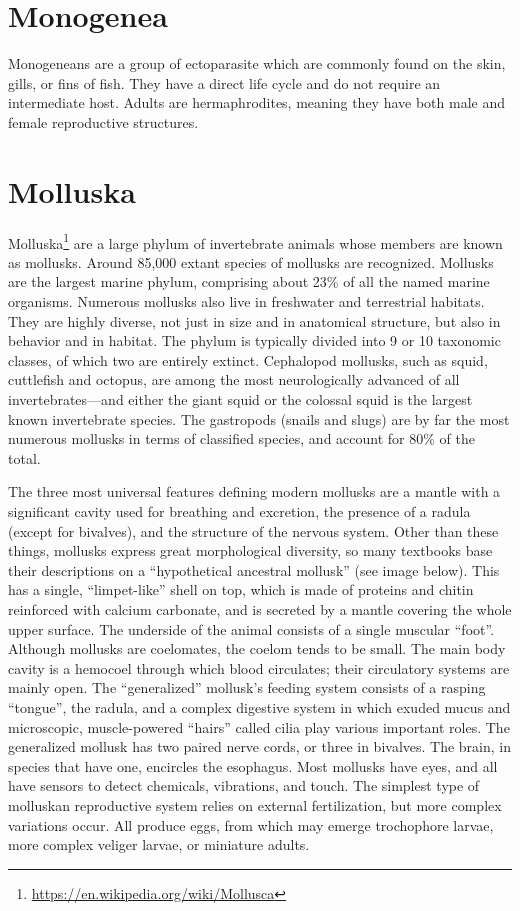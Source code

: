 \documentclass[]{book}
\let\rmarkdownfootnote\footnote%
\def\footnote{\protect\rmarkdownfootnote}
\renewcommand{\href}[2]{#2\footnote{\url{#1}}}
\theoremstyle{definition}
\theoremstyle{definition}
\theoremstyle{definition}
\theoremstyle{remark}
\begin{document}
\section{Monogenea}\label{monogenea}

Monogeneans are a group of ectoparasite which are commonly found on the
skin, gills, or fins of fish. They have a direct life cycle and do not
require an intermediate host. Adults are hermaphrodites, meaning they
have both male and female reproductive structures.

\section{Molluska}\label{molluska}

\href{https://en.wikipedia.org/wiki/Mollusca}{Molluska} are a large
phylum of invertebrate animals whose members are known as mollusks.
Around 85,000 extant species of mollusks are recognized. Mollusks are
the largest marine phylum, comprising about 23\% of all the named marine
organisms. Numerous mollusks also live in freshwater and terrestrial
habitats. They are highly diverse, not just in size and in anatomical
structure, but also in behavior and in habitat. The phylum is typically
divided into 9 or 10 taxonomic classes, of which two are entirely
extinct. Cephalopod mollusks, such as squid, cuttlefish and octopus, are
among the most neurologically advanced of all invertebrates---and either
the giant squid or the colossal squid is the largest known invertebrate
species. The gastropods (snails and slugs) are by far the most numerous
mollusks in terms of classified species, and account for 80\% of the
total.

The three most universal features defining modern mollusks are a mantle
with a significant cavity used for breathing and excretion, the presence
of a radula (except for bivalves), and the structure of the nervous
system. Other than these things, mollusks express great morphological
diversity, so many textbooks base their descriptions on a ``hypothetical
ancestral mollusk'' (see image below). This has a single,
``limpet-like'' shell on top, which is made of proteins and chitin
reinforced with calcium carbonate, and is secreted by a mantle covering
the whole upper surface. The underside of the animal consists of a
single muscular ``foot''. Although mollusks are coelomates, the coelom
tends to be small. The main body cavity is a hemocoel through which
blood circulates; their circulatory systems are mainly open. The
``generalized'' mollusk's feeding system consists of a rasping
``tongue'', the radula, and a complex digestive system in which exuded
mucus and microscopic, muscle-powered ``hairs'' called cilia play
various important roles. The generalized mollusk has two paired nerve
cords, or three in bivalves. The brain, in species that have one,
encircles the esophagus. Most mollusks have eyes, and all have sensors
to detect chemicals, vibrations, and touch. The simplest type of
molluskan reproductive system relies on external fertilization, but more
complex variations occur. All produce eggs, from which may emerge
trochophore larvae, more complex veliger larvae, or miniature adults.
\end{document}
